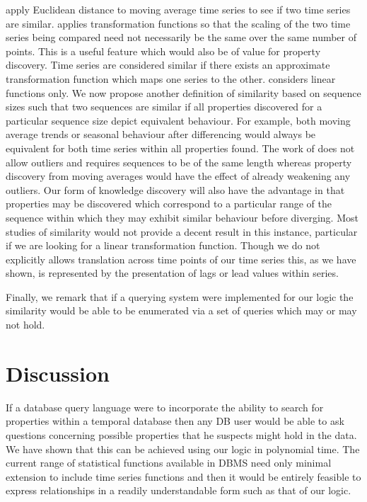 \medskip

\cite{rm97} apply Euclidean distance
to moving average time series to see if two time series are similar. 
\cite{dgm97} applies transformation functions so that the scaling of
the two time series being compared need not necessarily be the same
over the same number of points. This is a useful feature which would
also be of value for property discovery. Time series are considered
similar if there exists an approximate transformation function which maps one
series to the other. \cite{dgm97} considers linear functions only. We
now propose another definition of similarity based on sequence sizes
such that two sequences are similar if all properties discovered for a
particular sequence size depict equivalent behaviour. For example,
both moving average trends or seasonal behaviour after differencing
would always be equivalent for both time series within all properties
found. The work of \cite{alss95} does not allow outliers and requires
sequences to be of the same length whereas
property discovery from moving averages would have the effect of
already weakening any outliers. Our form of knowledge discovery will
also have the advantage in that properties may be discovered which
correspond to a particular range of the sequence within which they may
exhibit similar behaviour before diverging.
Most studies of similarity
would not provide a decent result in this instance, particular if we
are looking for a linear transformation function.  Though we do not
explicitly allows translation across time points of our time series
this, as we have shown, is represented by the presentation of lags or
lead values within series. 

\medskip

Finally, we remark that if a querying system were implemented for our
logic the similarity would be able to be enumerated via a set of
queries which may or may not hold.

\section{Discussion}\label{sec:tr_disc}



If a database query language were to incorporate the ability to search
for properties within a temporal database then any DB user would be
able to ask questions concerning possible properties that he suspects
might hold in the data. We have shown that this can be achieved using
our logic in polynomial time. The current range of statistical
functions available in DBMS need only minimal extension to include time
series functions and then it would be entirely feasible to express
relationships in a readily understandable form such as that of our
logic.
 
